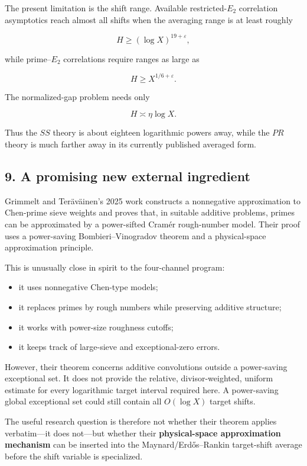 The present limitation is the shift range. Available restricted-\(E_2\) correlation asymptotics reach almost all shifts when the averaging range is at least roughly

\[
H\ge(\log X)^{19+\varepsilon},
\]

while prime--\(E_2\) correlations require ranges as large as

\[
H\ge X^{1/6+\varepsilon}.
\]

The normalized-gap problem needs only

\[
H\asymp\eta\log X.
\]

Thus the \(SS\) theory is about eighteen logarithmic powers away, while the \(PR\) theory is much farther away in its currently published averaged form.

\subsection*{9. A promising new external ingredient}

Grimmelt and Teräväinen's 2025 work constructs a nonnegative approximation to Chen-prime sieve weights and proves that, in suitable additive problems, primes can be approximated by a power-sifted Cramér rough-number model. Their proof uses a power-saving Bombieri--Vinogradov theorem and a physical-space approximation principle.

This is unusually close in spirit to the four-channel program:

\begin{itemize}
\item it uses nonnegative Chen-type models;
\item it replaces primes by rough numbers while preserving additive structure;
\item it works with power-size roughness cutoffs;
\item it keeps track of large-sieve and exceptional-zero errors.
\end{itemize}

However, their theorem concerns additive convolutions outside a power-saving exceptional set. It does not provide the relative, divisor-weighted, uniform estimate for every logarithmic target interval required here. A power-saving global exceptional set could still contain all \(O(\log X)\) target shifts.

The useful research question is therefore not whether their theorem applies verbatim---it does not---but whether their \textbf{physical-space approximation mechanism} can be inserted into the Maynard/Erdős--Rankin target-shift average before the shift variable is specialized.

